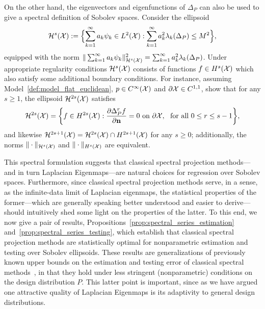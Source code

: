 On the other hand, the eigenvectors and eigenfunctions of $\Delta_P$ can also be used to give a spectral definition of Sobolev spaces. Consider the ellipsoid
\begin{equation}
\label{eqn:sobolev_ellipsoid}
\mathcal{H}^{s}(\mathcal{X}) := \Bigl\{\sum_{k = 1}^{\infty} a_k \psi_k \in L^2(\mathcal{X}):  \sum_{k = 1}^{\infty} a_k^2 \lambda_{k}(\Delta_P) \leq M^2 \Bigr\},
\end{equation}
equipped with the norm $\|\sum_{k = 1}^{\infty} a_k \psi_k\|_{\mathcal{H}^s(\mathcal{X})}^2 = \sum_{k = 1}^{\infty} a_k^2 \lambda_{k}(\Delta_P)$. Under appropriate regularity conditions $\mathcal{H}^s(\mathcal{X})$ consists of functions $f \in H^s(\mathcal{X})$ which also satisfy some additional boundary conditions. For instance, assuming Model~\ref{def:model_flat_euclidean}, $p \in C^{\infty}(\mathcal{X})$ and $\partial \mathcal{X} \in C^{1,1}$, \citet{dunlop2020} show that for any $s \geq 1$, the ellipsoid $\mathcal{H}^{2s}(\mathcal{X})$ satisfies
\begin{equation}
\label{eqn:sobolev_ellipsoid_to_sobolev_ball}
\mathcal{H}^{2s}(\mathcal{X}) = 
\biggl\{f \in H^{2s}(\mathcal{X}): \frac{\partial \Delta_P^rf}{\partial {\bf n}} = 0~\textrm{on}~\partial\mathcal{X},~~\textrm{for all $0 \leq r \leq s - 1$} \biggr\},
\end{equation}
and likewise $\mathcal{H}^{2s + 1}(\mathcal{X}) = \mathcal{H}^{2s}(\mathcal{X}) \cap H^{2s + 1}(\mathcal{X})$ for any $s \geq 0$; additionally, the norms $\|\cdot\|_{\mathcal{H}^s(\mathcal{X})}$ and $\|\cdot\|_{H^s(\mathcal{X})}$ are equivalent.

This spectral formulation suggests that classical spectral projection methods---and in turn Laplacian Eigenmaps---are natural choices for regression over Sobolev spaces. Furthermore, since classical spectral projection methods serve, in a sense, as the infinite-data limit of Laplacian eigenmaps, the statistical properties of the former---which are generally speaking better understood and easier to derive---should intuitively shed some light on the properties of the latter. To this end, we now give a pair of results, Propositions~\ref{prop:spectral_series_estimation} and~\ref{prop:spectral_series_testing}, which establish that classical spectral projection methods are statistically optimal for nonparametric estimation and testing over Sobolev ellipsoids. These results are generalizations of previously known upper bounds on the estimation and testing error of classical spectral methods~\citep{tsybakov08,ingster2009}, in that they hold under less stringent (nonparametric) conditions on the design distribution $P$. This latter point is important, since as we have argued one attractive quality of Laplacian Eigenmaps is its adaptivity to general design distributions.

